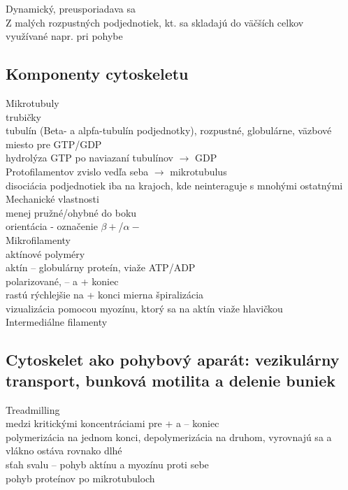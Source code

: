 Dynamický, preusporiadava sa\\
Z malých rozpustných podjednotiek, kt. sa skladajú do väčších celkov\\
\tab využívané napr. pri pohybe\\
\subsection{Komponenty cytoskeletu}
Mikrotubuly\\
\tab trubičky\\
\tab tubulín (Beta- a alpfa-tubulín podjednotky), rozpustné, globulárne, väzbové miesto pre GTP/GDP\\
\tab hydrolýza GTP po naviazaní tubulínov $\rightarrow$ GDP\\
 Protofilamentov zvislo vedľa seba $\rightarrow$ mikrotubulus\\
\tab disociácia podjednotiek iba na krajoch, kde neinteraguje s mnohými ostatnými\\

Mechanické vlastnosti\\
\tab menej pružné/ohybné do boku\\
\tab orientácia - označenie $\beta+$/$\alpha-$\\

Mikrofilamenty\\
\tab aktínové polyméry\\
\tab aktín -- globulárny proteín, viaže ATP/ADP\\
\tab polarizované, -- a + koniec\\
\tab rastú rýchlejšie na + konci
\tab mierna špiralizácia\\
\tab vizualizácia pomocou myozínu, ktorý sa na aktín viaže hlavičkou\\

Intermediálne filamenty\\
\subsection{Cytoskelet ako pohybový aparát: vezikulárny transport, bunková motilita a delenie buniek}
Treadmilling\\
\tab medzi kritickými koncentráciami pre + a -- koniec\\
\tab polymerizácia na jednom konci, depolymerizácia na druhom, vyrovnajú sa a vlákno ostáva rovnako dlhé\\
sťah svalu -- pohyb aktínu a myozínu proti sebe\\
pohyb proteínov po mikrotubuloch\\


